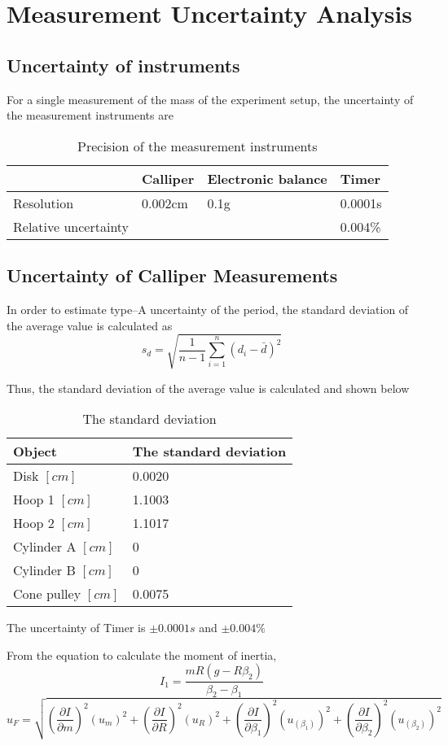 \section{Measurement Uncertainty Analysis}


\subsection{Uncertainty of instruments}
For a single measurement of the mass of the experiment setup, the uncertainty of the measurement instruments are

\begin{table}[H]
  \centering
  \begin{tabularx}{\textwidth}{|X|X|X|X|}
    \hline
     & Calliper & Electronic balance & Timer\\
	 \hline
	 Resolution & 0.002cm & 0.1g & 0.0001s \\
	 \hline
	 Relative uncertainty & & & 0.004\% \\
	\hline
  \end{tabularx}
  \caption{Precision of the measurement instruments}
  \end{table}

\subsection{Uncertainty of Calliper Measurements}

In order to estimate type–A uncertainty of the period, the standard deviation of the average value is calculated as
$$  s_d = \sqrt{\frac{1}{n-1}\sum_{i=1}^{n}(d_i - \bar{d})^2 }  $$

Thus, the standard deviation of the average value is calculated and shown below

\begin{table}[H]
  \centering
  \begin{tabularx}{\textwidth}{|p{6cm}|X|}
    \hline
    Object & The standard deviation\\
    \hline
    Disk $[cm]$& 0.0020 \\
    Hoop 1 $[cm]$& 1.1003 \\
    Hoop 2 $[cm]$& 1.1017 \\
    Cylinder A $[cm]$& 0 \\
    Cylinder B $[cm]$& 0 \\
    Cone pulley $[cm]$& 0.0075 \\
    \hline
  \end{tabularx}
  \caption{The standard deviation}
  \end{table}


The uncertainty of Timer is $\pm 0.0001s $ and $\pm 0.004\%$

From the equation to calculate the moment of inertia,
$$ I_1=\frac{mR(g-R\beta_2)}{\beta_2-\beta_1} $$
$$ u_F = \sqrt{(\frac{\partial I}{\partial m})^2(u_m)^2 +   (\frac{\partial I}{\partial R})^2(u_R)^2+(\frac{\partial I}{\partial \beta_1 })^2(u_(\beta_1))^2+ (\frac{\partial I}{\partial \beta_2})^2(u_(\beta_2))^2   }$$



